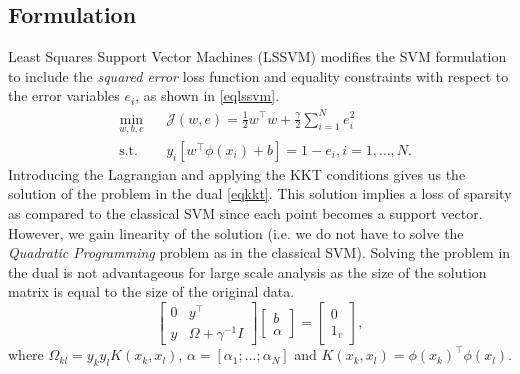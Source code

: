 \documentclass[conference, cmex10]{IEEEtran}
\begin{document}
\subsection{Formulation}
Least Squares Support Vector Machines (LSSVM) \cite{lssvmbook} \cite{Suykens1999} modifies the SVM formulation to include the \textit{squared error} loss function and equality constraints with respect to the error variables $e_i$, as shown in \eqref{eqlssvm}. 
\begin{equation}\label{eqlssvm}
\begin{aligned}
& \underset{w,b,e}{\text{min}}
& & \mathcal{J}(w,e) = \frac{1}{2}w^{\intercal}w + \frac{\gamma}{2}\sum\limits_{i=1}^N e_{i}^2 \\
& \text{s.t.}
& & y_{i}[ w^{\intercal}\phi(x_{i})+b ] = 1 - e_{i}, i=1,\ldots ,N.
\end{aligned}
\end{equation}
Introducing the Lagrangian and applying the KKT conditions gives us the solution of the problem in the dual \eqref{eqkkt}. This solution implies a loss of sparsity as compared to the classical SVM since each point becomes a support vector. However, we gain linearity of the solution (i.e. we do not have to solve the \textit{Quadratic Programming} problem as in the classical SVM). Solving the problem in the dual is not advantageous for large scale analysis as the size of the solution matrix is equal to the size of the original data.  
\begin{equation}
\label{eqkkt}
\left[\begin{array}{c|c}
   0  & y^\intercal   \\ \hline
   y & \Omega + \gamma^{-1} \mathit{I} 
\end{array}\right] 
\left[\begin{array}{c}
   b    \\ \hline
   \alpha  
\end{array}\right] = \left[\begin{array}{c}
   0    \\ \hline
   1_v  
\end{array}\right],
\end{equation}
where $\Omega_{kl} = y_{k}y_{l}K(x_{k}, x_{l})$, $\alpha = \left[\alpha_1 ; ... ; \alpha_N \right]$ and $K(x_k,x_l) = \phi(x_k)^\intercal\phi(x_l)$.
\end{document}
